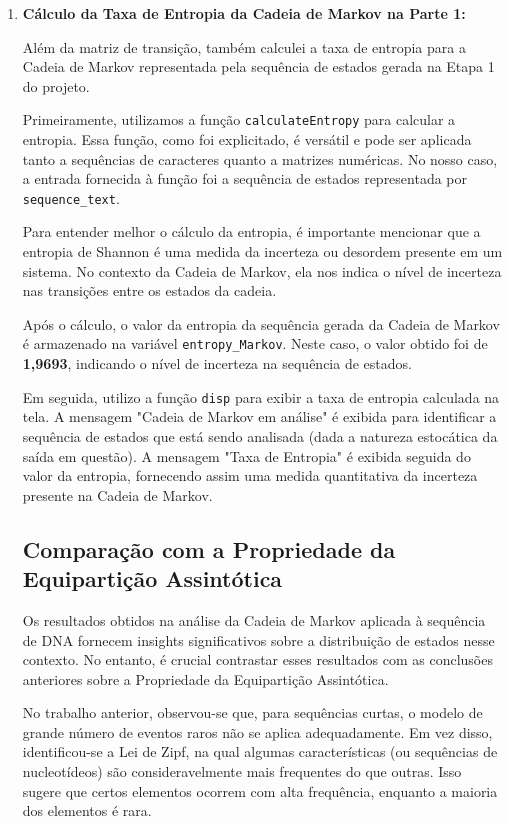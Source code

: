 \documentclass{article}
\begin{document}
\begin{enumerate}
    \item \textbf{Cálculo da Taxa de Entropia da Cadeia de Markov na Parte 1:} 
    
    Além da matriz de transição, também calculei a taxa de entropia para a Cadeia de Markov representada pela sequência de estados gerada na Etapa 1 do projeto. 
    
    Primeiramente, utilizamos a função \texttt{calculateEntropy} para calcular a entropia. Essa função, como foi explicitado, é versátil e pode ser aplicada tanto a sequências de caracteres quanto a matrizes numéricas. No nosso caso, a entrada fornecida à função foi a sequência de estados representada por \texttt{sequence\_text}.
    
    Para entender melhor o cálculo da entropia, é importante mencionar que a entropia de Shannon é uma medida da incerteza ou desordem presente em um sistema. No contexto da Cadeia de Markov, ela nos indica o nível de incerteza nas transições entre os estados da cadeia.
    
    Após o cálculo, o valor da entropia da sequência gerada da Cadeia de Markov é armazenado na variável \texttt{entropy\_Markov}. Neste caso, o valor obtido foi de \textbf{1,9693}, indicando o nível de incerteza na sequência de estados.
    
    Em seguida, utilizo a função \texttt{disp} para exibir a taxa de entropia calculada na tela. A mensagem "Cadeia de Markov em análise" é exibida para identificar a sequência de estados que está sendo analisada (dada a natureza estocática da saída em questão). A mensagem "Taxa de Entropia" é exibida seguida do valor da entropia, fornecendo assim uma medida quantitativa da incerteza presente na Cadeia de Markov.

    \subsection{Comparação com a Propriedade da Equipartição Assintótica}
    
    Os resultados obtidos na análise da Cadeia de Markov aplicada à sequência de DNA fornecem insights significativos sobre a distribuição de estados nesse contexto. No entanto, é crucial contrastar esses resultados com as conclusões anteriores sobre a Propriedade da Equipartição Assintótica.

    No trabalho anterior, observou-se que, para sequências curtas, o modelo de grande número de eventos raros não se aplica adequadamente. Em vez disso, identificou-se a Lei de Zipf, na qual algumas características (ou sequências de nucleotídeos) são consideravelmente mais frequentes do que outras. Isso sugere que certos elementos ocorrem com alta frequência, enquanto a maioria dos elementos é rara.


\end{enumerate}
\end{document}
